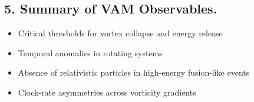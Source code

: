 \subsection*{5. Summary of VAM Observables.}
\begin{itemize}
    \item Critical thresholds for vortex collapse and energy release
    \item Temporal anomalies in rotating systems
    \item Absence of relativistic particles in high-energy fusion-like events
    \item Clock-rate asymmetries across vorticity gradients
\end{itemize}